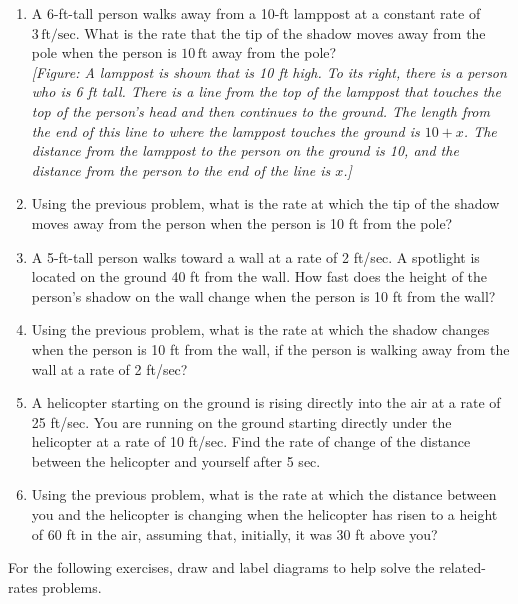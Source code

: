 \documentclass{exercises}
\begin{document}
\begin{enumerate}[resume]
\item A 6-ft-tall person walks away from a 10-ft lamppost at a constant rate of $3\,\text{ft/sec}$. What is the rate that the tip of the shadow moves away from the pole when the person is $10\,\text{ft}$ away from the pole? \\ \textit{[Figure: A lamppost is shown that is 10 ft high. To its right, there is a person who is 6 ft tall. There is a line from the top of the lamppost that touches the top of the person's head and then continues to the ground. The length from the end of this line to where the lamppost touches the ground is $10 + x$. The distance from the lamppost to the person on the ground is 10, and the distance from the person to the end of the line is $x$.]}
\item Using the previous problem, what is the rate at which the tip of the shadow moves away from the person when the person is 10 ft from the pole?
\item A 5-ft-tall person walks toward a wall at a rate of 2 ft/sec. A spotlight is located on the ground 40 ft from the wall. How fast does the height of the person's shadow on the wall change when the person is 10 ft from the wall?
\item Using the previous problem, what is the rate at which the shadow changes when the person is 10 ft from the wall, if the person is walking away from the wall at a rate of 2 ft/sec?
\item A helicopter starting on the ground is rising directly into the air at a rate of 25 ft/sec. You are running on the ground starting directly under the helicopter at a rate of 10 ft/sec. Find the rate of change of the distance between the helicopter and yourself after 5 sec.
\item Using the previous problem, what is the rate at which the distance between you and the helicopter is changing when the helicopter has risen to a height of 60 ft in the air, assuming that, initially, it was 30 ft above you?
\end{enumerate}

For the following exercises, draw and label diagrams to help solve the related-rates problems.
\end{document}
